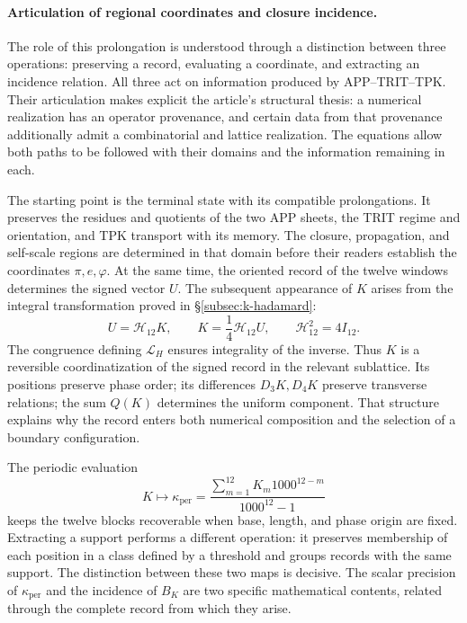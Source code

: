 \paragraph{Articulation of regional coordinates and closure incidence.}
\label{inc-ampl-articulacion}
The role of this prolongation is understood through a distinction
between three operations: preserving a record, evaluating a coordinate, and
extracting an incidence relation. All three act on information
produced by APP--TRIT--TPK. Their articulation makes explicit the article's
structural thesis: a numerical realization has an operator
provenance, and certain data from that provenance additionally admit a
combinatorial and lattice realization. The equations allow both
paths to be followed with their domains and the information remaining in each.

The starting point is the terminal state with its compatible
prolongations. It preserves the residues and quotients of the two APP
sheets, the TRIT regime and orientation, and TPK transport with its memory.
The closure, propagation, and self-scale regions are determined in that
domain before their readers establish the coordinates
$\pi,e,\varphi$. At the same time, the oriented record of the twelve
windows determines the signed vector $U$. The subsequent appearance of $K$
arises from the integral transformation proved in
\S\ref{subsec:k-hadamard}:
\begin{equation}
 U=\mathcal H_{12}K,\qquad
 K=\frac14\mathcal H_{12}U,\qquad
 \mathcal H_{12}^{2}=4I_{12}.
 \label{inc-ampl-registro}
\end{equation}
The congruence defining $\mathcal L_H$ ensures integrality of
the inverse. Thus $K$ is a reversible coordinatization
of the signed record in the relevant sublattice. Its positions preserve
phase order; its differences $D_3K,D_4K$ preserve transverse
relations; the sum $Q(K)$ determines the uniform component. That
structure explains why the record enters both numerical composition
and the selection of a boundary configuration.

The periodic evaluation
\[
 K\longmapsto\kappa_{\mathrm{per}}
 =\frac{\sum_{m=1}^{12}K_m1000^{12-m}}{1000^{12}-1}
\]
keeps the twelve blocks recoverable when base, length, and phase origin
are fixed. Extracting a support performs a different
operation: it preserves membership of each position in a class defined
by a threshold and groups records with the same support. The
distinction between these two maps is decisive. The scalar
precision of $\kappa_{\mathrm{per}}$ and the incidence of $B_K$ are two
specific mathematical contents, related through the complete
record from which they arise.

